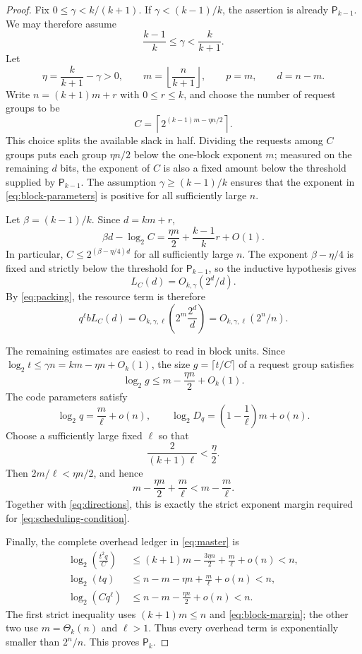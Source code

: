 \documentclass[11pt]{article}
\begin{document}
\begin{proof}
Fix $0\le\gamma<k/(k+1)$.  If $\gamma<(k-1)/k$, the assertion is already
$\mathsf P_{k-1}$.  We may therefore assume
\[
  \frac{k-1}{k}\le\gamma<\frac{k}{k+1}.
\]
Let
\[
  \eta=\frac{k}{k+1}-\gamma>0,
  \qquad
  m=\left\lfloor\frac{n}{k+1}\right\rfloor,
  \qquad
  p=m,
  \qquad
  d=n-m.
\]
Write $n=(k+1)m+r$ with $0\le r\le k$, and choose the number of request
groups to be
\begin{equation}\label{eq:block-parameters}
  C=\left\lceil
       2^{(k-1)m-\eta n/2}
     \right\rceil.
\end{equation}
This choice splits the available slack in half.  Dividing the requests among
$C$ groups puts each group $\eta n/2$ below the one-block exponent $m$;
measured on the remaining $d$ bits, the exponent of $C$ is also a fixed
amount below the threshold supplied by $\mathsf P_{k-1}$.
The assumption $\gamma\ge(k-1)/k$ ensures that the exponent in
\eqref{eq:block-parameters} is positive for all sufficiently large $n$.

Let $\beta=(k-1)/k$.  Since $d=km+r$,
\[
  \beta d-\log_2C
  =\frac{\eta n}{2}+\frac{k-1}{k}r+O(1).
\]
In particular, $C\le2^{(\beta-\eta/4)d}$ for all sufficiently large $n$.
The exponent $\beta-\eta/4$ is fixed and strictly below the threshold for
$\mathsf P_{k-1}$, so the inductive hypothesis gives
\[
  L_C(d)=O_{k,\gamma}(2^d/d).
\]
By \cref{eq:packing}, the resource term is therefore
\[
  q^\ell bL_C(d)
  =O_{k,\gamma,\ell}\!\left(2^m\frac{2^d}{d}\right)
  =O_{k,\gamma,\ell}(2^n/n).
\]

The remaining estimates are easiest to read in block units.  Since
$\log_2t\le\gamma n=km-\eta n+O_k(1)$, the size
$g=\lceil t/C\rceil$ of a request group satisfies
\[
  \log_2g\le m-\frac{\eta n}{2}+O_k(1).
\]
The code parameters satisfy
\[
  \log_2q=\frac m\ell+o(n),
  \qquad
  \log_2D_q=\left(1-\frac1\ell\right)m+o(n).
\]
Choose a sufficiently large fixed $\ell$ so that
\begin{equation}\label{eq:block-margin}
  \frac{2}{(k+1)\ell}<\frac{\eta}{2}.
\end{equation}
Then $2m/\ell<\eta n/2$, and hence
\[
  m-\frac{\eta n}{2}+\frac m\ell
  <m-\frac m\ell.
\]
Together with \eqref{eq:directions}, this is exactly the strict exponent margin
required for \cref{eq:scheduling-condition}.

Finally, the complete overhead ledger in \cref{eq:master} is
\begin{align*}
  \log_2\!\left(\frac{t^2q}{C}\right)
  &\le (k+1)m-\frac{3\eta n}{2}+\frac m\ell+o(n)<n,\\
  \log_2(tq)
  &\le n-m-\eta n+\frac m\ell+o(n)<n,\\
  \log_2(Cq^\ell)
  &\le n-m-\frac{\eta n}{2}+o(n)<n.
\end{align*}
The first strict inequality uses $(k+1)m\le n$ and
\eqref{eq:block-margin}; the other two use $m=\Theta_k(n)$ and $\ell>1$.
Thus every overhead term is exponentially smaller than $2^n/n$.  This proves
$\mathsf P_k$.
\end{proof}
\end{document}

